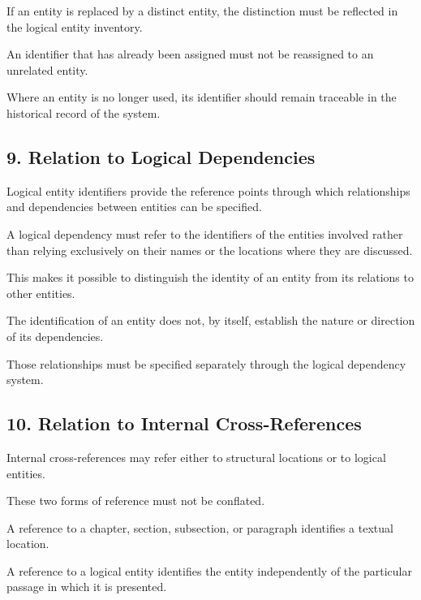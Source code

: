 If an entity is replaced by a
distinct entity, the distinction
must be reflected in the logical
entity inventory.

An identifier that has already
been assigned must not be
reassigned to an unrelated entity.

Where an entity is no longer
used, its identifier should
remain traceable in the historical
record of the system.


\subsection*{9. Relation to Logical Dependencies}

Logical entity identifiers provide
the reference points through which
relationships and dependencies
between entities can be specified.

A logical dependency must refer
to the identifiers of the entities
involved rather than relying
exclusively on their names or
the locations where they are
discussed.

This makes it possible to distinguish
the identity of an entity from
its relations to other entities.

The identification of an entity
does not, by itself, establish
the nature or direction of its
dependencies.

Those relationships must be
specified separately through
the logical dependency system.


\subsection*{10. Relation to Internal
Cross-References}

Internal cross-references may
refer either to structural locations
or to logical entities.

These two forms of reference
must not be conflated.

A reference to a chapter, section,
subsection, or paragraph identifies
a textual location.

A reference to a logical entity
identifies the entity independently
of the particular passage in which
it is presented.

